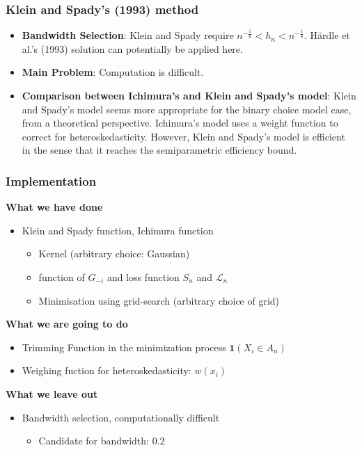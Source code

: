 \documentclass{beamer}
\begin{document}
\begin{frame}
\frametitle{Klein and Spady's (1993) method}
\begin{itemize}
	\setlength\itemsep{1.5em}

	\item \textbf{Bandwidth Selection}: Klein and Spady require $ n^{-\frac{1}{6}} < h_n < n^{-\frac{1}{8}}$. H{\"a}rdle et al.'s (1993) solution can potentially be applied here.
	

	\item \textbf{Main Problem}: Computation is difficult.
	
	
	\item \textbf{Comparison between Ichimura's and Klein and Spady's model}:
	Klein and Spady's model seems more appropriate for the binary choice model case, from a theoretical perspective. Ichimura's model uses a weight function to correct for heteroskedasticity. However, Klein and Spady's model is efficient in the sense that it reaches the semiparametric efficiency bound.
	
\end{itemize}
\end{frame}



\begin{frame}[t]
	\frametitle{Implementation}

	\textbf{What we have done}
	\begin{itemize}
		\item Klein and Spady function, Ichimura function 
		\begin{itemize}\item Kernel (arbitrary choice: Gaussian) 
			\item function of $G_{-i}$ and loss function $S_n$ and $\mathcal{L}_n$
			\item Minimisation using grid-search  (arbitrary choice of grid)
		\end{itemize}
	\end{itemize}
          \textbf{What we are going to do}
	\begin{itemize}
		\item Trimming Function in the minimization process $\mathbf{1}{(X_i \in A_n)}$
		\item Weighing fuction for heteroskedasticity: $w(x_i)$
	\end{itemize}

	\smallskip

	\textbf{What we leave out}
	\begin{itemize}
		\item Bandwidth selection, computationally difficult
		\begin{itemize}
			\item Candidate for bandwidth: $0.2$
		\end{itemize}
	\end{itemize}
	\note{~}
\end{frame}
\end{document}
